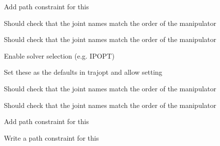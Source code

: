 \begin{DoxyRefList}
\label{todo__todo000035}%
%
Add path constraint for this 

\label{todo__todo000036}%
%
Should check that the joint names match the order of the manipulator 

\label{todo__todo000037}%
%
Should check that the joint names match the order of the manipulator  
\item[Member \mbox{\hyperlink{classtesseract__planning_1_1TrajOptIfoptMotionPlanner_aa86732e70ee5102815d15b896927e14d}{tesseract\+\_\+planning\+::Traj\+Opt\+Ifopt\+Motion\+Planner\+::solve}} (const \mbox{\hyperlink{structtesseract__planning_1_1PlannerRequest}{Planner\+Request}} \&request, \mbox{\hyperlink{structtesseract__planning_1_1PlannerResponse}{Planner\+Response}} \&response, bool verbose=false) const override]\label{todo__todo000032}%
%
Enable solver selection (e.\+g. IPOPT) 

\label{todo__todo000033}%
%
Set these as the defaults in trajopt and allow setting  
\item[Member \mbox{\hyperlink{classtesseract__planning_1_1TrajOptMotionPlanner_a6f42bc4743b8be6fd310b7e75282796d}{tesseract\+\_\+planning\+::Traj\+Opt\+Motion\+Planner\+::create\+Problem}} (const \mbox{\hyperlink{structtesseract__planning_1_1PlannerRequest}{Planner\+Request}} \&request) const]\label{todo__todo000031}%
%
Should check that the joint names match the order of the manipulator 

\label{todo__todo000030}%
%
Should check that the joint names match the order of the manipulator 

\label{todo__todo000029}%
%
Add path constraint for this 

\label{todo__todo000028}%
%
Write a path constraint for this 
\end{DoxyRefList}